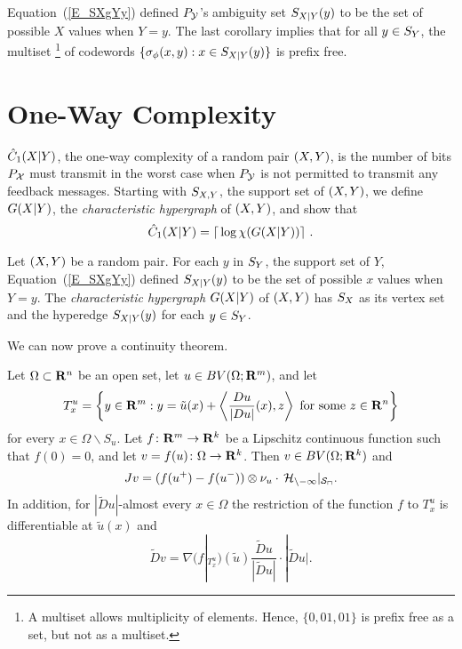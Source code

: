 Equation~(\ref{E_SXgYy}) defined ${P_{\cal Y}}$'s ambiguity set ${S_{X|Y}(y)}$
to be the set of possible $X$ values when $Y=y$.
The last corollary implies that for all $y\in{S_Y}$,
the multiset%
\footnote{A multiset allows multiplicity of elements.
Hence, $\{0,01,01\}$ is prefix free as a set, but not as a multiset.}
of codewords $\{{\sigma_\phi(x,y)}:x\in{S_{X|Y}(y)}\}$ is prefix free.

\section{One-Way Complexity}
\label{S_Cp1}

${\hat C_1(X|Y)}$, the one-way complexity of a random pair ${(X,Y)}$,
is the number of bits ${P_{\cal X}}$ must transmit in the worst case
when ${P_{\cal Y}}$ is not permitted to transmit any feedback messages.
Starting with ${S_{X,Y}}$, the support set of ${(X,Y)}$, we define ${G(X|Y)}$,
the {\it characteristic hypergraph\/} of ${(X,Y)}$, and show that
\[
\Cw1=\lceil\,\log\cG\rceil\ .
\]

Let ${(X,Y)}$ be a random pair.
For each $y$ in ${S_Y}$, the support set of $Y$, Equation~(\ref{E_SXgYy})
defined ${S_{X|Y}(y)}$ to be the set of possible $x$ values when $Y=y$.
The {\it characteristic hypergraph\/} ${G(X|Y)}$ of ${(X,Y)}$
has ${S_X}$ as its vertex set and the hyperedge ${S_{X|Y}(y)}$ for each $y\in{S_Y}$.


We can now prove a continuity theorem.
\begin{thm}\label{t:conl}
Let $\Omega \subset\bold R^n$ be an open set, let
$u\in BV(\Omega ;\bold R^m)$, and let
\begin{equation}\label{quts}
T^u_x=\left\{y\in\bold R^m: y=\tilde u(x)+\left\langle \frac{Du}{|Du|}(x),z
\right\rangle \text{ for some }z\in\bold R^n\right\}
\end{equation}
for every $x\in\Omega \backslash S_u$. Let $f\colon \bold R^m\to \bold
R^k$ be a Lipschitz continuous function such that $f(0)=0$, and let $v=f(u)\colon
\Omega \to \bold R^k$. Then $v\in BV(\Omega ;\bold R^k)$ and
\begin{equation}
Jv=(f(u^+)-f(u^-))\otimes \nu_u\cdot\, \cal
H_{n-1}|_{S_u}.\end{equation}
In addition, for $|\widetilde{D}u|$-almost every $x\in\Omega $ the restriction
of the function $f$ to $T^u_x$ is differentiable at $\tilde u(x)$ and
\begin{equation}
\widetilde{D}v=\nabla (f|_{T^u_x})(\tilde u)\frac{\widetilde{D}u}{|
\widetilde{D}u|}\cdot|\widetilde{D}u|.\end{equation}
\end{thm}

